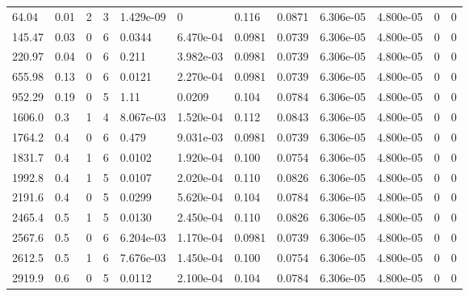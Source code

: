 \documentclass[preview]{standalone}
\begin{document}
{{\begin{tabular}{L{1.2cm}C{1.2cm} C{0.3cm}C{0.5cm} C{1.4cm}C{1.4cm} C{1.4cm}C{1.4cm} C{1.6cm}C{1.6cm} C{1.6cm}C{1.6cm}}
  64.04  &  0.01  & 2     &  3 &  1.429e-09  & 0  &  0.116&   0.0871& 6.306e-05 & 4.800e-05   &  0 & 0  \\ 
  145.47  &  0.03  & 0     &  6 &  0.0344  & 6.470e-04  &  0.0981&   0.0739& 6.306e-05 & 4.800e-05   &  0 & 0  \\ 
  220.97  &  0.04  & 0     &  6 &  0.211  & 3.982e-03  &  0.0981&   0.0739& 6.306e-05 & 4.800e-05   &  0 & 0  \\ 
  655.98  &  0.13  & 0     &  6 &  0.0121  & 2.270e-04  &  0.0981&   0.0739& 6.306e-05 & 4.800e-05   &  0 & 0  \\ 
  952.29  &  0.19  & 0     &  5 &  1.11  & 0.0209  &  0.104&   0.0784& 6.306e-05 & 4.800e-05   &  0 & 0  \\ 
  1606.0  &   0.3  & 1     &  4 &  8.067e-03  & 1.520e-04  &  0.112&   0.0843& 6.306e-05 & 4.800e-05   &  0 & 0  \\ 
  1764.2  &   0.4  & 0     &  6 &  0.479  & 9.031e-03  &  0.0981&   0.0739& 6.306e-05 & 4.800e-05   &  0 & 0  \\ 
  1831.7  &   0.4  & 1     &  6 &  0.0102  & 1.920e-04  &  0.100&   0.0754& 6.306e-05 & 4.800e-05   &  0 & 0  \\ 
  1992.8  &   0.4  & 1     &  5 &  0.0107  & 2.020e-04  &  0.110&   0.0826& 6.306e-05 & 4.800e-05   &  0 & 0  \\ 
  2191.6  &   0.4  & 0     &  5 &  0.0299  & 5.620e-04  &  0.104&   0.0784& 6.306e-05 & 4.800e-05   &  0 & 0  \\ 
  2465.4  &   0.5  & 1     &  5 &  0.0130  & 2.450e-04  &  0.110&   0.0826& 6.306e-05 & 4.800e-05   &  0 & 0  \\ 
  2567.6  &   0.5  & 0     &  6 &  6.204e-03  & 1.170e-04  &  0.0981&   0.0739& 6.306e-05 & 4.800e-05   &  0 & 0  \\ 
  2612.5  &   0.5  & 1     &  6 &  7.676e-03  & 1.450e-04  &  0.100&   0.0754& 6.306e-05 & 4.800e-05   &  0 & 0  \\ 
  2919.9  &   0.6  & 0     &  5 &  0.0112  & 2.100e-04  &  0.104&   0.0784& 6.306e-05 & 4.800e-05   &  0 & 0  \\ 
\hline 
\end{tabular} 

}}
\end{document}
